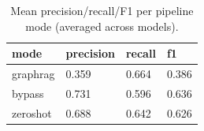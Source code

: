 \begin{table}[ht]
\centering
\caption{Mean precision/recall/F1 per pipeline mode (averaged across models).}
\label{tab:per_mode}
\begin{tabular}{llll}
\toprule
mode & precision & recall & f1 \\
\midrule
graphrag & 0.359 & 0.664 & 0.386 \\
bypass & 0.731 & 0.596 & 0.636 \\
zeroshot & 0.688 & 0.642 & 0.626 \\
\bottomrule
\end{tabular}
\end{table}
